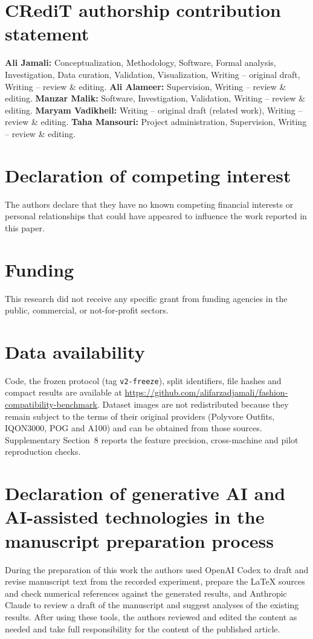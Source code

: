 \section*{CRediT authorship contribution statement}
\textbf{Ali Jamali:} Conceptualization, Methodology, Software, Formal analysis, Investigation, Data curation, Validation, Visualization, Writing -- original draft, Writing -- review \& editing.
\textbf{Ali Alameer:} Supervision, Writing -- review \& editing.
\textbf{Manzar Malik:} Software, Investigation, Validation, Writing -- review \& editing.
\textbf{Maryam Vadikheil:} Writing -- original draft (related work), Writing -- review \& editing.
\textbf{Taha Mansouri:} Project administration, Supervision, Writing -- review \& editing.

\section*{Declaration of competing interest}
The authors declare that they have no known competing financial interests or personal relationships that could have appeared to influence the work reported in this paper.

\section*{Funding}
This research did not receive any specific grant from funding agencies in the public, commercial, or not-for-profit sectors.

\section*{Data availability}
Code, the frozen protocol (tag \texttt{v2-freeze}), split identifiers, file hashes and compact results are available at \url{https://github.com/alifarzadjamali/fashion-compatibility-benchmark}. Dataset images are not redistributed because they remain subject to the terms of their original providers (Polyvore Outfits, IQON3000, POG and A100) and can be obtained from those sources.
Supplementary Section~8 reports the feature precision, cross-machine and pilot reproduction checks.

\section*{Declaration of generative AI and AI-assisted technologies in the manuscript preparation process}
During the preparation of this work the authors used OpenAI Codex to draft and revise manuscript text from the recorded experiment, prepare the LaTeX sources and check numerical references against the generated results, and Anthropic Claude to review a draft of the manuscript and suggest analyses of the existing results. After using these tools, the authors reviewed and edited the content as needed and take full responsibility for the content of the published article.
